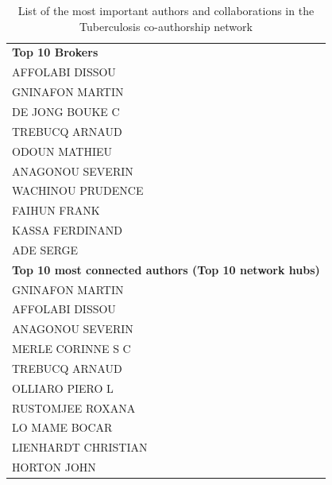 \begin{table}[h!]
\caption{List of the most important authors and collaborations in the Tuberculosis co-authorship network}
\label{table: tb_list}
\centering \small
\begin{tabular}{l}
  \toprule
\textbf{Top 10 Brokers}\\
\hspace{20pt}AFFOLABI DISSOU\\
\hspace{20pt}GNINAFON MARTIN\\
\hspace{20pt}DE JONG BOUKE C\\
\hspace{20pt}TREBUCQ ARNAUD\\
\hspace{20pt}ODOUN MATHIEU\\
\hspace{20pt}ANAGONOU SEVERIN\\
\hspace{20pt}WACHINOU PRUDENCE\\
\hspace{20pt}FAIHUN FRANK\\
\hspace{20pt}KASSA FERDINAND\\
\hspace{20pt}ADE SERGE\\
\hline
\textbf{Top 10 most connected authors (Top 10 network hubs)}\\
\hspace{20pt}GNINAFON MARTIN\\
\hspace{20pt}AFFOLABI DISSOU\\
\hspace{20pt}ANAGONOU SEVERIN\\
\hspace{20pt}MERLE CORINNE S C\\
\hspace{20pt}TREBUCQ ARNAUD\\
\hspace{20pt}OLLIARO PIERO L\\
\hspace{20pt}RUSTOMJEE ROXANA\\
\hspace{20pt}LO MAME BOCAR\\
\hspace{20pt}LIENHARDT CHRISTIAN\\
\hspace{20pt}HORTON JOHN\\

\end{tabular}
\end{table}
